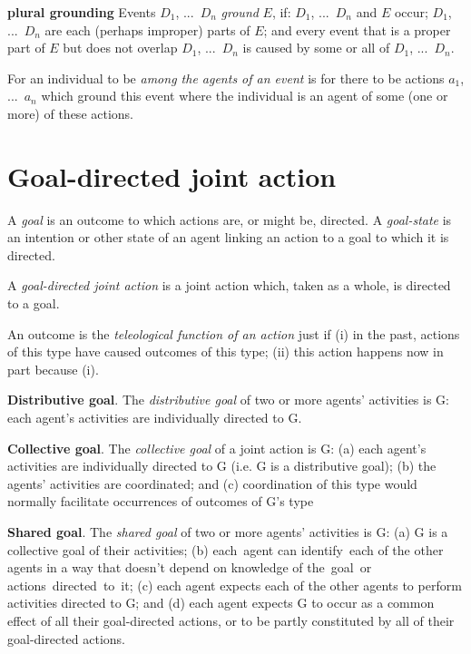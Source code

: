 \documentclass[11pt]{extarticle}
\begin{document}
\begin{multicols}{3}
\textbf{plural grounding} 
Events $D_1$, ...\ $D_n$ \emph{ground} $E$, if: $D_1$, ...\ $D_n$ and $E$ occur; 
$D_1$, ...\ $D_n$ are each (perhaps improper) parts of $E$; and 
every event that is a proper part of $E$ but does not overlap  $D_1$, ...\ $D_n$ is caused by some or all of $D_1$, ...\ $D_n$.

For an individual to be \emph{among the agents of an event} is for there to be actions $a_1$, ...\ $a_n$ which ground this event where the individual is an agent of some (one or more) of these actions.


\section{Goal-directed joint action}
A \emph{goal} is an outcome to which actions are, or might be, directed.  A \emph{goal-state} is an intention or other state of an agent linking an action to a goal to which it is directed.

A \emph{goal-directed joint action} is a joint action which, taken as a whole, is directed to a goal.

An outcome is the \emph{teleological function of an action} just if (i) in the past, actions of this type have caused outcomes of this type; (ii) this action happens now in part because (i).\citep{Wright:1976ls}



\textbf{Distributive goal}.  The \emph{distributive goal} of two or more agents' activities is G: each agent's activities are individually directed to G.

\textbf{Collective goal}.  The \emph{collective goal} of a joint action is G:
(a) each agent’s activities are individually directed to G (i.e. G is a distributive goal);
(b) the agents’ activities are coordinated; and 
(c) coordination of this type would normally  facilitate occurrences of outcomes of G's type

\textbf{Shared goal}.  The \emph{shared goal} of two or more agents' activities is G: (a) G is a collective goal of their activities; 
(b) each agent can identify each of the other agents in a way that doesn't depend on knowledge of the goal or	 actions directed to it;
(c) each agent expects each of the other agents to perform activities directed to G; and 
(d) each agent expects G to occur as a common effect of all their goal-directed actions, or to be partly constituted by all of their goal-directed actions.


\ 


\end{multicols}
\end{document}

